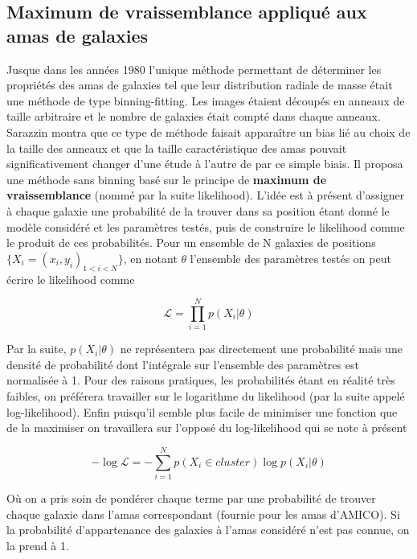 \documentclass[a4paper,11pt]{article}
\numberwithin{equation}{section}
\begin{document}
\begin{multicols}{2}
  \subsection{Maximum de vraissemblance appliqué aux amas de galaxies}
    Jusque dans les années 1980 l'unique méthode permettant de déterminer les propriétés des amas de galaxies tel que leur distribution radiale de masse était une méthode de type binning-fitting. Les images étaient découpés en anneaux de taille arbitraire et le nombre de galaxies était compté dans chaque anneaux. Sarazzin montra\cite{Sarazin1980} que ce type de méthode faisait apparaître un bias lié au choix de la taille des anneaux et que la taille caractéristique des amas pouvait significativement changer d'une étude à l'autre de par ce simple biais. Il proposa une méthode sans binning basé sur le principe de \textbf{maximum de vraissemblance} (nommé par la suite likelihood).\newline
    L'idée est à présent d'assigner à chaque galaxie une probabilité de la trouver dans sa position étant donné le modèle considéré et les paramètres testés, puis de construire le likelihood comme le produit de ces probabilités. Pour un ensemble de N galaxies de positions $ \lbrace X_i = (x_i , y_i )_{1 < i < N} \rbrace $, en notant $\theta$ l'ensemble des paramètres testés on peut écrire le likelihood comme
    
    \begin{equation}
      \label{Likelihood}
      \mathscr{L} = \prod_{i=1}^N p( X_i | \theta)
    \end{equation}
    
    Par la suite, $p(X_i | \theta)$ ne représentera pas directement une probabilité mais une densité de probabilité dont l'intégrale sur l'ensemble des paramètres est normalisée à 1. Pour des raisons pratiques, les probabilités étant en réalité très faibles, on préférera travailler sur le logarithme du likelihood (par la suite appelé log-likelihood). Enfin puisqu'il semble plus facile de minimiser une fonction que de la maximiser on travaillera sur l'opposé du log-likelihood qui se note à présent
    
    \begin{equation}
      \label{Log_Likelihood}
      - \log \mathscr{L} = - \sum_{i=1}^N p (X_i \in cluster) \log p (X_i | \theta)
    \end{equation}
    
    Où on a pris soin de pondérer chaque terme par une probabilité de trouver chaque galaxie dans l'amas correspondant (fournie pour les amas d'AMICO). Si la probabilité d'appartenance des galaxies à l'amas considéré n'est pas connue, on la prend à 1.
    

\end{multicols}
\end{document}
